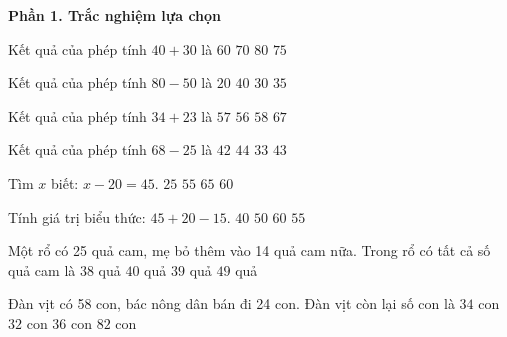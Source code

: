 \textbf{Phần 1. Trắc nghiệm lựa chọn}

\begin{ex} %
Kết quả của phép tính $40 + 30$ là
\choice
{$60$}
{\True $70$}
{$80$}
{$75$}
\end{ex}

\begin{ex} %
Kết quả của phép tính $80 - 50$ là
\choice
{$20$}
{$40$}
{\True $30$}
{$35$}
\end{ex}

\begin{ex} %
Kết quả của phép tính $34 + 23$ là
\choice
{\True $57$}
{$56$}
{$58$}
{$67$}
\end{ex}

\begin{ex} %
Kết quả của phép tính $68 - 25$ là
\choice
{$42$}
{$44$}
{$33$}
{\True $43$}
\end{ex}

\begin{ex} %
Tìm $x$ biết: $x - 20 = 45$.
\choice
{$25$}
{$55$}
{\True $65$}
{$60$}
\end{ex}

\begin{ex} %
Tính giá trị biểu thức: $45 + 20 - 15$.
\choice
{$40$}
{\True $50$}
{$60$}
{$55$}
\end{ex}

\begin{ex} %
Một rổ có 25 quả cam, mẹ bỏ thêm vào 14 quả cam nữa. Trong rổ có tất cả số quả cam là
\choice
{$38$ quả}
{$40$ quả}
{\True $39$ quả}
{$49$ quả}
\end{ex}

\begin{ex} %
Đàn vịt có 58 con, bác nông dân bán đi 24 con. Đàn vịt còn lại số con là
\choice
{\True $34$ con}
{$32$ con}
{$36$ con}
{$82$ con}
\end{ex}

